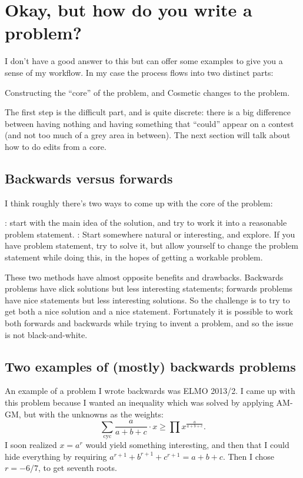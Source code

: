 \documentclass[11pt]{scrartcl}
\renewcommand{\vonenvname}{inlineprob}
\theoremstyle{inlined}
\begin{document}
\section{Okay, but how do you write a problem?}
\renewcommand{\vonenvname}{example}
I don't have a good answer to this but can offer some examples
to give you a sense of my workflow.
In my case the process flows into two distinct parts:
\begin{itemize}
  \ii Constructing the ``core'' of the problem, and
  \ii Cosmetic changes to the problem.
\end{itemize}
The first step is the difficult part, and is quite discrete:
there is a big difference between having nothing
and having something that ``could'' appear on a contest
(and not too much of a grey area in between).
The next section will talk about how to do edits from a core.

\subsection{Backwards versus forwards}
I think roughly there's two ways to come up with the core of the problem:
\begin{itemize}
  \ii {}:
  start with the main idea of the solution,
  and try to work it into a reasonable problem statement.
  \ii {}: Start somewhere natural or interesting, and explore.
  If you have problem statement, try to solve it,
  but allow yourself to change the problem statement while doing this,
  in the hopes of getting a workable problem.
\end{itemize}

These two methods have almost opposite benefits and drawbacks.
Backwards problems have slick solutions but less interesting statements;
forwards problems have nice statements but less interesting solutions.
So the challenge is to try to get both a nice solution and a nice statement.
Fortunately it is possible to work both forwards and backwards
while trying to invent a problem, and so the issue is not black-and-white.

\subsection{Two examples of (mostly) backwards problems}
An example of a problem I wrote backwards was ELMO 2013/2.
I came up with this problem because I wanted an inequality
which was solved by applying AM-GM,
but with the unknowns as the weights:
\[ \sum_{\text{cyc}} \frac{a}{a+b+c} \cdot x \ge \prod x^{\frac{a}{a+b+c}}. \]
I soon realized $x = a^r$ would yield something interesting,
and then that I could hide everything by
requiring $a^{r+1} + b^{r+1} + c^{r+1} = a+b+c$.
Then I chose $r = -6/7$, to get seventh roots.
\end{document}
